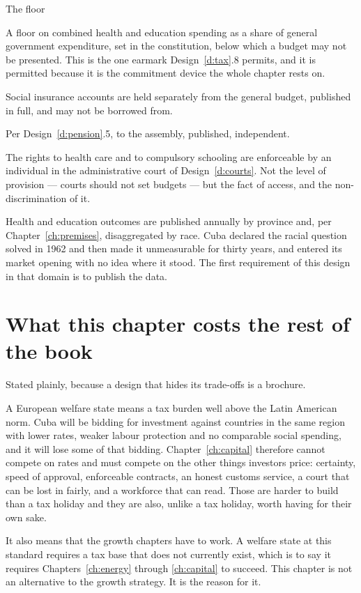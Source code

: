 \begin{design}{The floor}
\label{d:floor}
\begin{rules}
 A floor on combined health and education spending
as a share of general government expenditure, set in the constitution, below
which a budget may not be presented. This is the one earmark
Design~\ref{d:tax}.8 permits, and it is permitted because it is the commitment
device the whole chapter rests on.

 Social insurance accounts are held separately from
the general budget, published in full, and may not be borrowed from.

 Per Design~\ref{d:pension}.5, to the assembly,
published, independent.

 The rights to health care and to compulsory schooling are
enforceable by an individual in the administrative court of
Design~\ref{d:courts}. Not the level of provision --- courts should not set
budgets --- but the fact of access, and the non-discrimination of it.

 Health and education outcomes are published annually
by province and, per Chapter~\ref{ch:premises}, disaggregated by race. Cuba
declared the racial question solved in 1962 and then made it unmeasurable for
thirty years, and entered its market opening with no idea where it stood. The
first requirement of this design in that domain is to publish the data.
\end{rules}
\end{design}

\section{What this chapter costs the rest of the book}

Stated plainly, because a design that hides its trade-offs is a brochure.

A European welfare state means a tax burden well above the Latin American norm.
Cuba will be bidding for investment against countries in the same region with
lower rates, weaker labour protection and no comparable social spending, and it
will lose some of that bidding. Chapter~\ref{ch:capital} therefore cannot
compete on rates and must compete on the other things investors price:
certainty, speed of approval, enforceable contracts, an honest customs service,
a court that can be lost in fairly, and a workforce that can read. Those are
harder to build than a tax holiday and they are also, unlike a tax holiday,
worth having for their own sake.

It also means that the growth chapters have to work. A welfare state at this
standard requires a tax base that does not currently exist, which is to say it
requires Chapters~\ref{ch:energy} through \ref{ch:capital} to succeed. This
chapter is not an alternative to the growth strategy. It is the reason for it.
